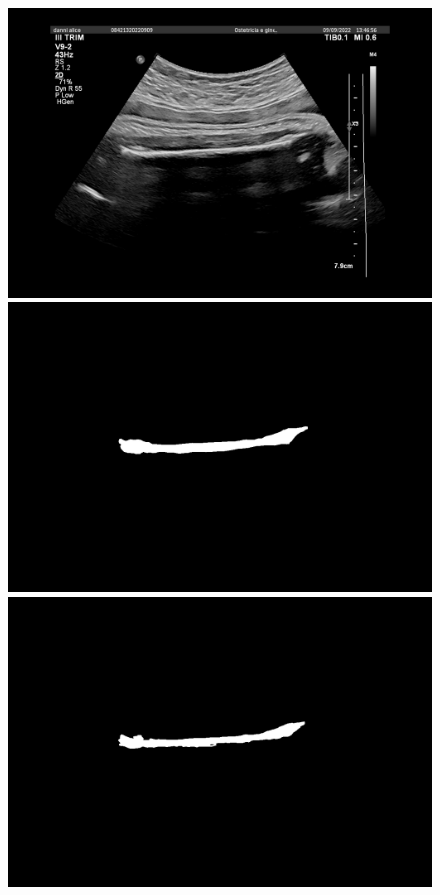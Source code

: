 \begin{figure}[!ht]
	\centering
	\begin{minipage}{0.32\textwidth}
		\centering
		\includegraphics[width=\linewidth]{Immagini/image.png}
	\end{minipage}
	\hfill %
	\begin{minipage}{0.32\textwidth}
		\centering
		\includegraphics[width=\linewidth]{Immagini/mask.png}
	\end{minipage}
	\hfill %
	\begin{minipage}{0.32\textwidth}
		\centering
		\includegraphics[width=\linewidth]{Immagini/prediction.png}
	\end{minipage}


\end{figure}
